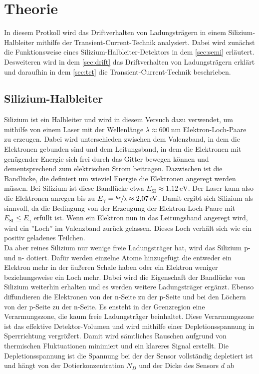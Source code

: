 \section{Theorie}
\label{sec:theory}
In diesem Protkoll wird das Driftverhalten von Ladungsträgern in einem Silizium-Halbleiter mithilfe der Transient-Current-Technik analysiert. Dabei wird zunächst die Funktionsweise eines Silizium-Halbleiter-Detektors in dem \autoref{sec:semi} erläutert. Desweiteren wird in dem \autoref{sec:drift} das Driftverhalten von Ladungsträgern erklärt und daraufhin in dem \autoref{sec:tct} die Transient-Current-Technik beschrieben.
\subsection{Silizium-Halbleiter}
\label{sec:semi}
Silizium ist ein Halbleiter und wird in diesem Versuch dazu verwendet, um mithilfe von einem Laser mit der Wellenlänge $\lambda \approx \SI{600}{\nano\meter}$ Elektron-Loch-Paare zu erzeugen. Dabei wird unterschieden zwischen dem Valenzband, in dem die Elektronen gebunden sind und dem Leitungsband, in dem die Elektronen mit genügender Energie sich frei durch das Gitter bewegen können und dementsprechend zum elektrischen Strom beitragen. Dazwischen ist die Bandlücke, die definiert um wieviel Energie die Elektronen angeregt werden müssen. Bei Silizium ist diese Bandlücke etwa $E_{\text{SI}} \approx \SI{1.12}{\eV}$. Der Laser kann also die Elektronen anregen bis zu $E_{\gamma} = \sfrac{hc}{\lambda} \approx \SI{2.07}{\eV}$. Damit ergibt sich Silizium als sinnvoll, da die Bedingung von der Erzeugung der Elektron-Loch-Paare mit $E_{\text{SI}} \le E_{\gamma}$ erfüllt ist. Wenn ein Elektron nun in das Leitungsband angeregt wird, wird ein ''Loch'' im Valenzband zurück gelassen. Dieses Loch verhält sich wie ein positiv geladenes Teilchen.\\
Da aber reines Silizium nur wenige freie Ladungsträger hat, wird das Silizium p- und n- dotiert. Dafür werden einzelne Atome hinzugefügt die entweder ein Elektron mehr in der äußeren Schale haben oder ein Elektron weniger beziehungsweise ein Loch mehr. Dabei wird die Eigenschaft der Bandlücke von Silizium weiterhin erhalten und es werden weitere Ladungsträger ergänzt. Ebenso diffundieren die Elektronen von der n-Seite zu der p-Seite und bei den Löchern von der p-Seite zu der n-Seite. Es ensteht in der Grenzregion eine Verarmungszone, die kaum freie Ladungsträger beinhaltet. Diese Verarmungszone ist das effektive Detektor-Volumen und wird mithilfe einer Depletionsspannung in Sperrrichtung vergrößert. Damit wird sämtliches Rauschen aufgrund von thermischen Fluktuationen minimiert und ein klareres Signal erstellt. Die Depletionsspannung ist die Spannung bei der der Sensor vollständig depletiert ist und hängt von der Dotierkonzentration $N_D$ und der Dicke des Sensors $d$ ab
